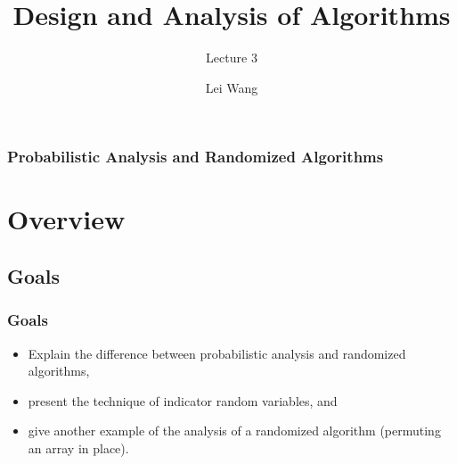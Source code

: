 \documentclass[notes,serif]{beamer}
\title{Design and Analysis of Algorithms}
\subtitle{Lecture 3}
\author{Lei Wang}
\institute{Dalian University of Technology}
\def\defn#1{{\color{red} #1}}
\begin{document}
\begin{frame}
  \titlepage
\end{frame}

\begin{frame}
  \frametitle{Probabilistic Analysis and Randomized Algorithms}
  \tableofcontents
\end{frame}

\section{Overview}
\subsection{Goals}

\begin{frame}
\frametitle{Goals}
\begin{itemize}
    \item Explain the difference between probabilistic analysis and randomized algorithms,
    \item present the technique of indicator random variables, and
    \item give another example of the analysis of a randomized algorithm (permuting an array in place).
\end{itemize}

%
%
%
%
%
%
%
%
%
%
%
%
%
\end{frame}
\end{document}
